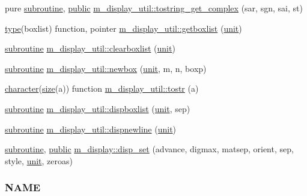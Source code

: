 \begin{DoxyCompactItemize}
\item 
pure \hyperlink{M__stopwatch_83_8txt_acfbcff50169d691ff02d4a123ed70482}{subroutine}, \hyperlink{M__stopwatch_83_8txt_a2f74811300c361e53b430611a7d1769f}{public} \hyperlink{namespacem__display__util_a7803f63457d826fc3b8fe7ddfa7818ac}{m\+\_\+display\+\_\+util\+::tostring\+\_\+get\+\_\+complex} (sar, sgn, sai, st)
\item 
\hyperlink{stop__watch_83_8txt_a70f0ead91c32e25323c03265aa302c1c}{type}(boxlist) function, pointer \hyperlink{namespacem__display__util_a093be898cc19ed648b45e728b72d4f5f}{m\+\_\+display\+\_\+util\+::getboxlist} (\hyperlink{M__stopwatch_83_8txt_a5cbef30eb7c0d734bd82f5a7ebea9aa7}{unit})
\item 
\hyperlink{M__stopwatch_83_8txt_acfbcff50169d691ff02d4a123ed70482}{subroutine} \hyperlink{namespacem__display__util_acc9b3b8faeba5d61ec46d3d76c161d27}{m\+\_\+display\+\_\+util\+::clearboxlist} (\hyperlink{M__stopwatch_83_8txt_a5cbef30eb7c0d734bd82f5a7ebea9aa7}{unit})
\item 
\hyperlink{M__stopwatch_83_8txt_acfbcff50169d691ff02d4a123ed70482}{subroutine} \hyperlink{namespacem__display__util_a5c3310ac01f093fd857b2a3aa3189e02}{m\+\_\+display\+\_\+util\+::newbox} (\hyperlink{M__stopwatch_83_8txt_a5cbef30eb7c0d734bd82f5a7ebea9aa7}{unit}, m, n, boxp)
\item 
\hyperlink{option__stopwatch_83_8txt_abd4b21fbbd175834027b5224bfe97e66}{character}(\hyperlink{what__overview_81_8txt_ab5692ed87074f1d5ec850a9ffa8b5af9}{size}(a)) function \hyperlink{namespacem__display__util_ae2d4ae17104c7a91b0a3e4962e3af54a}{m\+\_\+display\+\_\+util\+::tostr} (a)
\item 
\hyperlink{M__stopwatch_83_8txt_acfbcff50169d691ff02d4a123ed70482}{subroutine} \hyperlink{namespacem__display__util_af04928d07a7f716a0098c44bdd7ec3fd}{m\+\_\+display\+\_\+util\+::dispboxlist} (\hyperlink{M__stopwatch_83_8txt_a5cbef30eb7c0d734bd82f5a7ebea9aa7}{unit}, sep)
\item 
\hyperlink{M__stopwatch_83_8txt_acfbcff50169d691ff02d4a123ed70482}{subroutine} \hyperlink{namespacem__display__util_a0bbd58b5406fa166a20d83f9737c7acd}{m\+\_\+display\+\_\+util\+::dispnewline} (\hyperlink{M__stopwatch_83_8txt_a5cbef30eb7c0d734bd82f5a7ebea9aa7}{unit})
\item 
\hyperlink{M__stopwatch_83_8txt_acfbcff50169d691ff02d4a123ed70482}{subroutine}, \hyperlink{M__stopwatch_83_8txt_a2f74811300c361e53b430611a7d1769f}{public} \hyperlink{namespacem__display_aca571cfcf5dcced1070969200f717a28}{m\+\_\+display\+::disp\+\_\+set} (advance, digmax, matsep, orient, sep, style, \hyperlink{M__stopwatch_83_8txt_a5cbef30eb7c0d734bd82f5a7ebea9aa7}{unit}, zeroas)
\begin{DoxyCompactList}\small\item\em \subsubsection*{N\+A\+ME}


\end{DoxyCompactList}
\end{DoxyCompactItemize}
